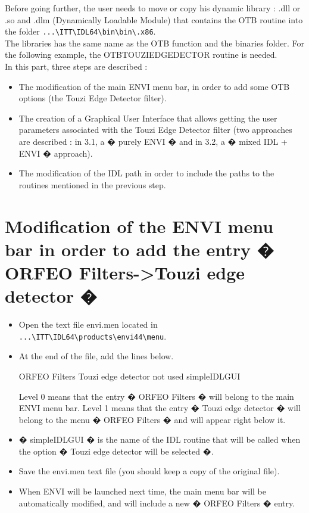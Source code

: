 Before going further, the user needs to move or copy his dynamic library : .dll or .so and .dlm (Dynamically Loadable Module) 
that contains the OTB routine into the folder  \verb|...\ITT\IDL64\bin\bin\.x86|.\\
The libraries has the same name as the OTB function and the binaries folder. For the following example, the OTBTOUZIEDGEDECTOR routine is needed.\\
In this part, three steps are described :
\begin{itemize}
    \item The modification of the main ENVI menu bar, in order to add some OTB options (the Touzi Edge Detector filter).
    \item The creation of a Graphical User Interface that allows getting the user parameters associated with the Touzi Edge Detector filter
    (two approaches are described : in 3.1, a � purely ENVI � and in 3.2, a � mixed IDL + ENVI � approach).
    \item The modification of the IDL path in order to include the paths to the routines mentioned in the previous step. 
\end{itemize}

\section{Modification of the ENVI menu bar in order to add the entry � ORFEO Filters->Touzi edge detector �}
\begin{itemize}
    \item Open the text file envi.men located in \verb|...\ITT\IDL64\products\envi44\menu|.
    \item At the end of the file, add the lines below.
        \begin{scriptsize}
             {ORFEO Filters}
             {Touzi edge detector} {not used} {simpleIDLGUI}
        \end{scriptsize}
        Level 0 means that the entry � ORFEO Filters � will belong to the main ENVI menu bar. 
        Level 1 means that the entry � Touzi edge detector � will belong to the menu � ORFEO Filters � and will appear right below it.
    \item � simpleIDLGUI � is the name of the IDL routine that will be called when the option � Touzi edge detector will be selected �.
    \item Save the envi.men text file (you should keep a copy of the original file).
    \item When ENVI will be launched next time, the main menu bar will be automatically modified, and will include a new � ORFEO Filters � entry.
\end{itemize}


